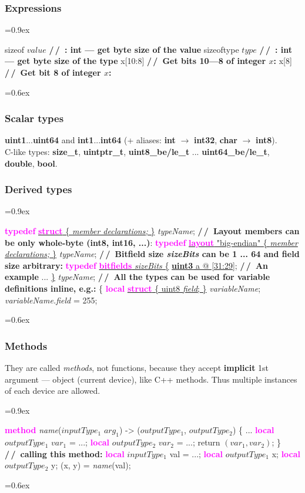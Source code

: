 \documentclass[8pt]{extarticle}
\newcommand{\vshort}[1]{%
\vspace{-0.6em}%
#1%
\vspace{0.0em}}
\newcommand{\vshort}[1]{%
#1%
}
\newenvironment{code}[1][]{%
\begin{prebox}[#1]\obeylines%
\fontdimen2\font=0.9ex%
}{%
\end{prebox}%
\fontdimen2\font=0.6ex%
}
\newcommand{\ind}{\hphantom{~~~}}
\newcommand{\kw}[1]{\textcolor{magenta}{\textbf{#1}}}
\newcommand{\ty}[1]{\textcolor{myOrange}{\textbf{#1}}}
\newcommand{\cmtcommon}[1]{\textcolor{Sepia}{\textbf{#1}}}
\newcommand{\cmtd}[1]{\cmtcommon{/\,/\ #1}}
\newcommand{\p}[1]{\textit{\large#1}}
\begin{document}
\begin{multicols*}{3}
    \subsubsection{Expressions}
    \begin{code}
        sizeof $value$  \cmtd{: int — get byte size of the value}
        sizeoftype \ty{$type$}  \cmtd{: int — get byte size of the type}
        x[10:8]  \cmtd{Get bits 10—8 of integer $x$:}
        x[8]  \cmtd{Get bit 8 of integer $x$:}
    \end{code}

    \subsubsection{Scalar types}
    \ty{uint1}...\ty{uint64} and \ty{int1}...\ty{int64} (+ aliases:
    \ty{int} $→$ \ty{int32}, \ty{char} $→$ \ty{int8}).
    \\
    C-like types: \ty{size_t}, \ty{uintptr_t}, \ty{uint8_be/le_t} ... \ty{uint64_be/le_t},
    \ty{double}, \ty{bool}.

    \subsubsection{Derived types}
    \begin{code}
        \kw{typedef} \underline{\kw{struct} \{ \p{member declarations;} \}} \p{typeName};
        \cmtd{Layout members can be only whole-byte (\ty{int8}, \ty{int16}, ...)}:
        \kw{typedef} \underline{\kw{layout} "big-endian" \{ \p{member declarations;} \}} \p{typeName};
        \cmtd{Bitfield size \p{sizeBits} can be 1 ... 64 and field size arbitrary:}
        \kw{typedef} \underline{\kw{bitfields} \p{sizeBits} \{}
            \ind \underline{\ty{uint3}  a @ [31:29];} \ind \cmtd{An example}
            \ind ...
        \underline{\}} \p{typeName};
        \cmtd{All the types can be used for variable definitions inline, e.g.:}
        \{
            \ind \kw{local} \underline{\kw{struct} \{ uint8 \p{field}; \}} \p{variableName};
            \ind \p{variableName.field} = 255;
    \end{code}
    

    \subsubsection{Methods}
    They are called \textit{methods}, not functions, because
    they accept \textbf{implicit} 1st argument — object (current
    device), like C++ methods. Thus multiple instances of each device are allowed.
    \begin{code}
        \kw{method} \p{name}(\ty{$inputType_1$} $arg_1$) -> (\ty{$outputType_1$}, \ty{$outputType_2$}) \{
            \vshort{\ind ...}
            \ind \kw{local} \ty{$outputType_1$} $var_1$ = ...; \kw{local} \ty{$outputType_2$} $var_2$ = ...;
            \ind return $(var_1, var_2)$;
        \}
        \cmtd{calling this method:}
        \kw{local} \ty{$inputType_1$} val = ...;
        \kw{local} \ty{$outputType_1$} x; \kw{local} \ty{$outputType_2$} y;
        (x, y) = \p{name}(val);
    \end{code}


\end{multicols*}
\end{document}
